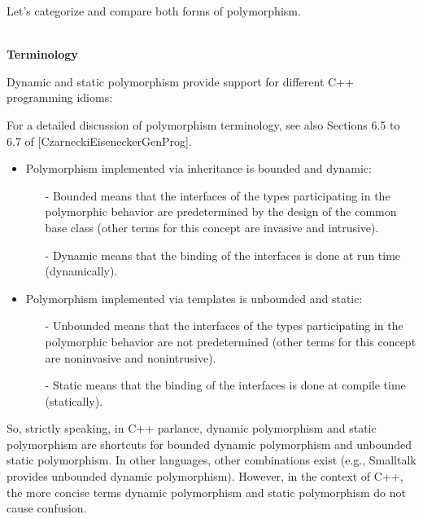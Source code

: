 
Let’s categorize and compare both forms of polymorphism.

\hspace*{\fill} \\ %
\noindent
\textbf{Terminology}

Dynamic and static polymorphism provide support for different C++ programming idioms:

\begin{tcolorbox}[colback=webgreen!5!white,colframe=webgreen!75!black]
\hspace*{0.75cm}For a detailed discussion of polymorphism terminology, see also Sections 6.5 to 6.7 of [CzarneckiEiseneckerGenProg].
\end{tcolorbox}

\begin{itemize}
\item 
Polymorphism implemented via inheritance is bounded and dynamic:

\begin{itemize}
\item[-]
Bounded means that the interfaces of the types participating in the polymorphic behavior are predetermined by the design of the common base class (other terms for this concept are invasive and intrusive).

\item[-]
Dynamic means that the binding of the interfaces is done at run time (dynamically).
\end{itemize}

\item 
Polymorphism implemented via templates is unbounded and static:

\begin{itemize}
\item[-]
Unbounded means that the interfaces of the types participating in the polymorphic behavior are not predetermined (other terms for this concept are noninvasive and nonintrusive).

\item[-]
Static means that the binding of the interfaces is done at compile time (statically).
\end{itemize}
\end{itemize}

So, strictly speaking, in C++ parlance, dynamic polymorphism and static polymorphism are shortcuts for bounded dynamic polymorphism and unbounded static polymorphism. In other languages, other combinations exist (e.g., Smalltalk provides unbounded dynamic polymorphism). However, in the context of C++, the more concise terms dynamic polymorphism and static polymorphism do not cause confusion.

